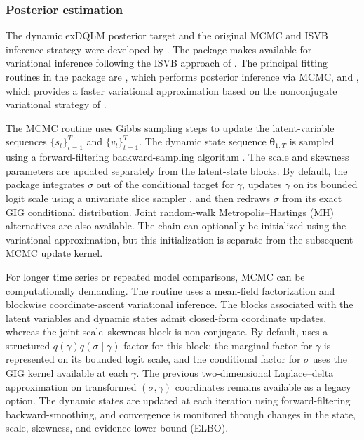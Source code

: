\documentclass{jss}
\newcommand{\vect}[1]{\boldsymbol{#1}}
\begin{document}
\subsubsection{Posterior estimation}

The dynamic exDQLM posterior target and the original MCMC and ISVB inference strategy were developed by \citet{me}. The package makes  available for variational inference following the ISVB approach of \citet{me}.
The principal fitting routines in the package are
, which performs posterior inference via MCMC, and , which provides a faster variational approximation based on
the nonconjugate variational strategy of \citet{wang2013nonconjugatevb}.

The MCMC routine uses Gibbs sampling steps to update the latent-variable sequences
$\{s_t\}_{t=1}^T$ and $\{v_t\}_{t=1}^T$. The dynamic state sequence $\vect{\theta}_{1:T}$ is sampled using a forward-filtering backward-sampling algorithm \citep{carter1994gibbs,fruhwirth1994data}.
The scale and skewness parameters are updated separately from the latent-state blocks. By default, the package integrates $\sigma$ out of the conditional target for $\gamma$, updates $\gamma$ on its bounded logit scale using a univariate slice sampler \citep{neal2003slice}, and then redraws $\sigma$ from its exact GIG conditional distribution. Joint
random-walk Metropolis--Hastings (MH) alternatives are also available.
The chain can optionally be initialized using the variational
approximation, but this initialization is separate from the subsequent MCMC
update kernel.


For longer time series or repeated model comparisons, MCMC can be computationally demanding. The  routine uses a mean-field factorization and blockwise coordinate-ascent variational inference. The blocks associated with the latent variables and dynamic states admit closed-form coordinate updates, whereas the joint scale--skewness block is non-conjugate. By default,  uses a structured \(q(\gamma)q(\sigma\mid\gamma)\) factor for this block: the marginal factor for \(\gamma\) is represented on its bounded logit scale, and the conditional factor for \(\sigma\) uses the GIG kernel available at each \(\gamma\). The previous two-dimensional Laplace--delta approximation on transformed \((\sigma,\gamma)\) coordinates remains available as a legacy option. The dynamic states are updated at each iteration using forward-filtering backward-smoothing, and convergence is monitored through changes in the state, scale, skewness, and evidence lower bound (ELBO).
\end{document}
